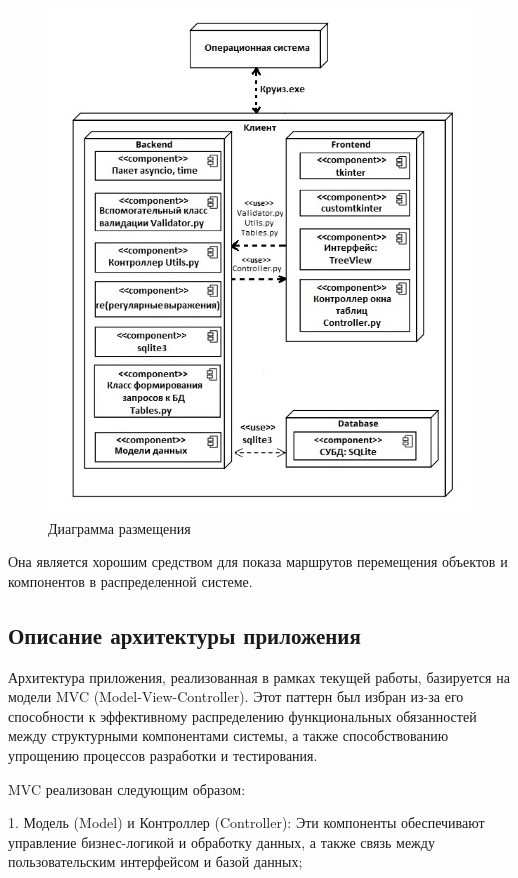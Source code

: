 \begin{figure} [ht]
	\centering
	\includegraphics[width=1\linewidth]{images/CommonScheme4}
	\caption{Диаграмма размещения}
	\label{fig:commonscheme4}
\end{figure}

Она является хорошим средством для показа маршрутов перемещения объектов и компонентов в распределенной системе.

\subsection{Описание архитектуры приложения}

Архитектура приложения, реализованная в рамках текущей работы, базируется на модели MVC (Model-View-Controller). Этот паттерн был избран из-за его способности к эффективному распределению функциональных обязанностей между структурными компонентами системы, а также способствованию упрощению процессов разработки и тестирования.

MVC реализован следующим образом:

1. Модель (Model) и Контроллер (Controller): Эти компоненты обеспечивают управление бизнес-логикой и обработку данных, а также связь между пользовательским интерфейсом и базой данных;

